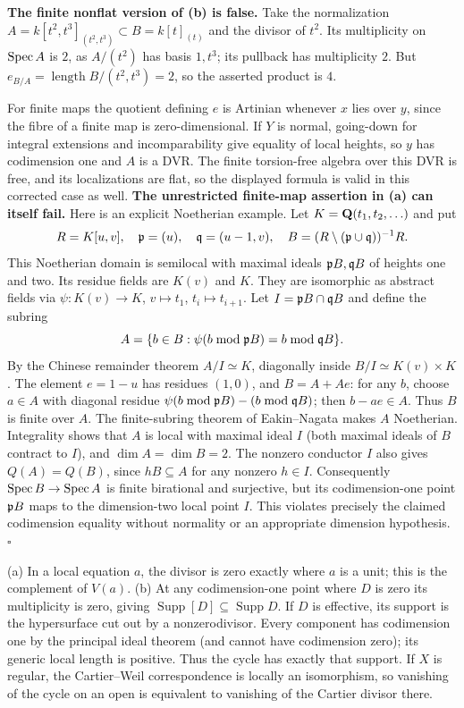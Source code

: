\documentclass[11pt]{article}
\let\chapterexercise\exercise
\renewcommand{\exercise}[2]{\Needspace{8\baselineskip}\chapterexercise{#1}{#2}}
\begin{document}
\textbf{The finite nonflat version of (b) is false.} Take the normalization $A=k[t^2,t^3]_{(t^2,t^3)}\subset B=k[t]_{(t)}$ and the divisor of $t^2$. Its multiplicity on $\operatorname{Spec} A$ is $2$, as $A/(t^2)$ has basis $1,t^3$; its pullback has multiplicity $2$. But $e_{B/A}=\operatorname{length}B/(t^2,t^3)=2$, so the asserted product is $4$.

For finite maps the quotient defining $e$ is Artinian whenever $x$ lies over $y$, since the fibre of a finite map is zero-dimensional. If $Y$ is normal, going-down for integral extensions and incomparability give equality of local heights, so $y$ has codimension one and $A$ is a DVR. The finite torsion-free algebra over this DVR is free, and its localizations are flat, so the displayed formula is valid in this corrected case as well. \textbf{The unrestricted finite-map assertion in (a) can itself fail.} Here is an explicit Noetherian example. Let $K=\mathbf Q(t_1,t_2,\ldots)$ and put
\[ R=K[u,v],\quad \mathfrak p=(u),\quad\mathfrak q=(u-1,v),\quad
B=(R\setminus(\mathfrak p\cup\mathfrak q))^{-1}R. \]
This Noetherian domain is semilocal with maximal ideals $\mathfrak p B,\mathfrak q B$ of heights one and two. Its residue fields are $K(v)$ and $K$. They are isomorphic as abstract fields via $\psi:K(v)\to K$, $v\mapsto t_1$, $t_i\mapsto t_{i+1}$. Let $I=\mathfrak p B\cap\mathfrak q B$ and define the subring
\[ A=\{b\in B:\psi(b\bmod\mathfrak p B)=b\bmod\mathfrak q B\}. \]
By the Chinese remainder theorem $A/I\simeq K$, diagonally inside $B/I\simeq K(v)\times K$. The element $e=1-u$ has residues $(1,0)$, and $B=A+Ae$: for any $b$, choose $a\in A$ with diagonal residue $\psi(b\bmod\mathfrak p B)-(b\bmod\mathfrak q B)$; then $b-ae\in A$. Thus $B$ is finite over $A$. The finite-subring theorem of Eakin--Nagata makes $A$ Noetherian. Integrality shows that $A$ is local with maximal ideal $I$ (both maximal ideals of $B$ contract to $I$), and $\dim A=\dim B=2$. The nonzero conductor $I$ also gives $Q(A)=Q(B)$, since $hB\subseteq A$ for any nonzero $h\in I$. Consequently $\operatorname{Spec} B\to\operatorname{Spec} A$ is finite birational and surjective, but its codimension-one point $\mathfrak p B$ maps to the dimension-two local point $I$. This violates precisely the claimed codimension equality without normality or an appropriate dimension hypothesis. \hfill$\square$

\pf
(a) In a local equation $a$, the divisor is zero exactly where $a$ is a unit; this is the complement of $V(a)$. (b) At any codimension-one point where $D$ is zero its multiplicity is zero, giving $\operatorname{Supp}[D]\subseteq\operatorname{Supp}D$. If $D$ is effective, its support is the hypersurface cut out by a nonzerodivisor. Every component has codimension one by the principal ideal theorem (and cannot have codimension zero); its generic local length is positive. Thus the cycle has exactly that support. If $X$ is regular, the Cartier--Weil correspondence is locally an isomorphism, so vanishing of the cycle on an open is equivalent to vanishing of the Cartier divisor there.
\end{document}
